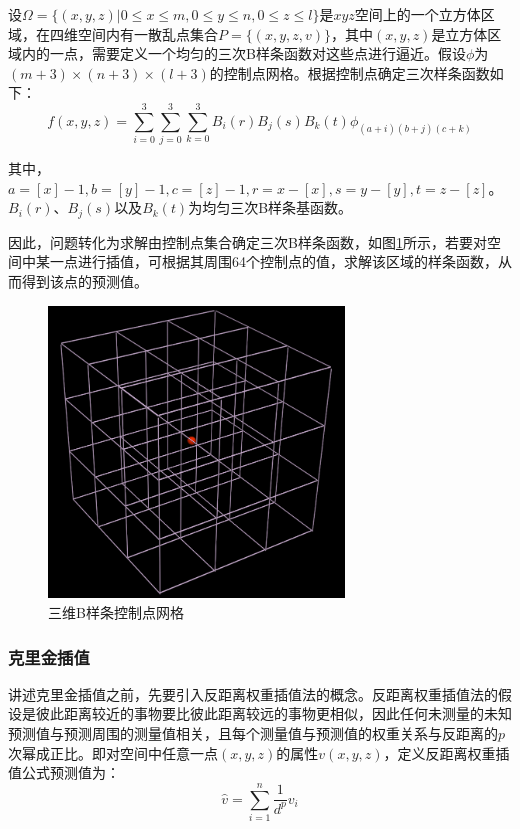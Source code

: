 \documentclass{article}
\begin{document}
设$ \Omega = \{ (x,y,z) | 0 \leqslant x \leqslant m,0 \leqslant y \leqslant n,0 \leqslant z \leqslant l\} $是$ xyz $空间上的一个立方体区域，在四维空间内有一散乱点集合$ P = \{ ( x,y,z,v ) \} $，其中$ (x,y,z) $是立方体区域内的一点，需要定义一个均匀的三次B样条函数对这些点进行逼近。假设$ \phi $为$ (m+3) \times (n+3) \times (l+3) $的控制点网格。根据控制点确定三次样条函数如下：
\begin{equation}
    f(x,y,z)=\sum_{i=0}^{3}\sum_{j=0}^{3}\sum_{k=0}^{3}B_{i}(r)B_{j}(s)B_{k}(t) \phi_{(a+i)(b+j)(c+k)}
\end{equation}

其中，$ a=[x]-1,b=[y]-1,c=[z]-1,r=x-[x],s=y-[y],t=z-[z]$。$ B_{i}(r)\text{、}B_{j}(s)\text{以及}B_{k}(t) $为均匀三次B样条基函数。

因此，问题转化为求解由控制点集合确定三次B样条函数，如图\ref{三维B样条控制点网格}所示，若要对空间中某一点进行插值，可根据其周围64个控制点的值，求解该区域的样条函数，从而得到该点的预测值。
\begin{figure}
    \centering
    \includegraphics[width=0.7\textwidth]{B-splines.png}
    \caption{三维B样条控制点网格}
    \label{三维B样条控制点网格}
\end{figure}

\subsubsection{克里金插值}
\songti{}
讲述克里金插值之前，先要引入反距离权重插值法的概念。反距离权重插值法的假设是彼此距离较近的事物要比彼此距离较远的事物更相似，因此任何未测量的未知预测值与预测周围的测量值相关，且每个测量值与预测值的权重关系与反距离的$ p $次幂成正比。即对空间中任意一点$ (x,y,z) $的属性$ v(x,y,z) $，定义反距离权重插值公式预测值为：
\begin{equation}
    \hat{v} = \sum_{i=1}^{n} \frac{1}{d^{p}}v_{i}
\end{equation}
\end{document}
